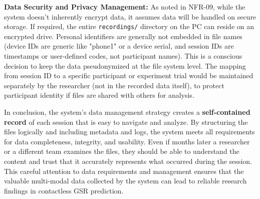 \documentclass[11pt,a4paper]{report}
\begin{document}
\textbf{Data Security and Privacy Management:} As noted in NFR-09, while the
system doesn't inherently encrypt data, it assumes data will be handled
on secure storage. If required, the entire \texttt{recordings/} directory on
the PC can reside on an encrypted drive. Personal identifiers are
generally not embedded in file names (device IDs are generic like
"phone1" or a device serial, and session IDs are timestamps or
user-defined codes, not participant names). This is a conscious decision
to keep the data pseudonymized at the file system level. The mapping
from session ID to a specific participant or experiment trial would be
maintained separately by the researcher (not in the recorded data
itself), to protect participant identity if files are shared with others
for analysis.

In conclusion, the system's data management strategy creates a
\textbf{self-contained record} of each session that is easy to navigate and
analyze. By structuring the files logically and including metadata and
logs, the system meets all requirements for data completeness,
integrity, and usability. Even if months later a researcher or a
different team examines the files, they should be able to understand the
content and trust that it accurately represents what occurred during the
session. This careful attention to data requirements and management
ensures that the valuable multi-modal data collected by the system can
lead to reliable research findings in contactless GSR prediction.



\end{document}
